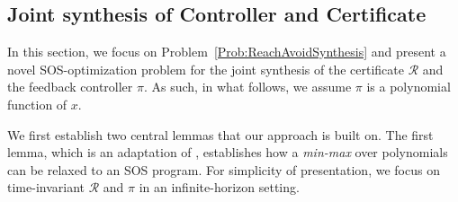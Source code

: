 \documentclass[journal,twoside,web]{ieeecolor}
\newcommand{\ml}[1]{{\color{blue}[ML: #1]}}
\newcommand{\RA}{\mathcal{R}}
\theoremstyle{definition}
\theoremstyle{plain}
\theoremstyle{plain}
\begin{document}



\subsection{Joint synthesis of Controller and Certificate}
In this section, we focus on Problem~\ref{Prob:ReachAvoidSynthesis} and present a novel SOS-optimization problem for the joint synthesis of the certificate $\RA$ and the feedback controller $\pi$.  As such, in what follows, we assume $\pi$ is a polynomial function of $x$.

We first establish two central lemmas that our approach is built on.
The first lemma, which is an adaptation of \cite{bach2025sum}, establishes how a \emph{min-max} over polynomials can be relaxed to an SOS program.  For simplicity of presentation, we focus on time-invariant $\RA$ and $\pi$ in an infinite-horizon setting.
\end{document}
